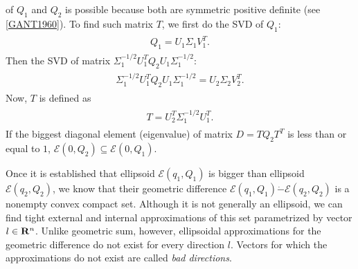 \documentclass[letterpaper,10pt,english]{sphinxmanual}
\begin{document}
of $Q_1$ and $Q_2$ is possible because both are symmetric
positive definite (see {\hyperref[chap_ellcalc:gant1960]{{[}GANT1960{]}}}). To find such matrix
$T$, we first do the SVD of $Q_1$:
\label{chap_ellcalc:equation-simdiag1}\begin{gather}
\begin{split}Q_1 = U_1\Sigma_1V_1^T .\end{split}\label{chap_ellcalc-simdiag1}
\end{gather}
Then the SVD of matrix
$\Sigma_1^{-1/2}U_1^TQ_2U_1\Sigma_1^{-1/2}$:
\label{chap_ellcalc:equation-simdiag2}\begin{gather}
\begin{split}\Sigma_1^{-1/2}U_1^TQ_2U_1\Sigma_1^{-1/2} = U_2\Sigma_2V_2^T.\end{split}\label{chap_ellcalc-simdiag2}
\end{gather}
Now, $T$ is defined as
\label{chap_ellcalc:equation-simdiag3}\begin{gather}
\begin{split}T = U_2^T \Sigma_1^{-1/2}U_1^T.\end{split}\label{chap_ellcalc-simdiag3}
\end{gather}
If the biggest diagonal element (eigenvalue) of matrix $D=TQ_2T^T$
is less than or equal to $1$,
${\mathcal E}(0,Q_2)\subseteq{\mathcal E}(0,Q_1)$.

Once it is established that ellipsoid ${\mathcal E}(q_1,Q_1)$ is
bigger than ellipsoid ${\mathcal E}(q_2,Q_2)$, we know that their
geometric difference
${\mathcal E}(q_1,Q_1)\dot{-}{\mathcal E}(q_2,Q_2)$ is a nonempty
convex compact set. Although it is not generally an ellipsoid, we can
find tight external and internal approximations of this set parametrized
by vector $l\in{\bf R}^n$. Unlike geometric sum, however,
ellipsoidal approximations for the geometric difference do not exist for
every direction $l$. Vectors for which the approximations do not
exist are called \emph{bad directions}.
\end{document}
